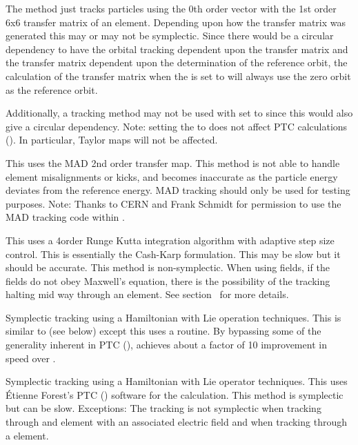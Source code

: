 \begin{description}
\item[\vn{Linear}]
The  method just tracks particles using the 0th order vector with the 1st order 6x6
transfer matrix of an element. Depending upon how the transfer matrix was generated this may or may
not be symplectic. Since there would be a circular dependency to have the orbital tracking dependent
upon the transfer matrix and the transfer matrix dependent upon the determination of the reference
orbit, the calculation of the transfer matrix when the  is set to 
will always use the zero orbit as the reference orbit.

Additionally, a  tracking method may not be used with  set to
 since this would also give a circular dependency. Note: setting the
 to  does not affect PTC calculations (). In
particular, Taylor maps will not be affected.

\item[\vn{MAD}]
This uses the MAD 2nd order transfer map. This method is not able to handle element misalignments or
kicks, and becomes inaccurate as the particle energy deviates from the reference energy. MAD
tracking should only be used for testing purposes. Note: Thanks to CERN and Frank Schmidt for
permission to use the MAD tracking code within \bmad.

\item[\vn{runge_kutta}]
This uses a 4\Th order Runge Kutta integration algorithm with adaptive step size control.  This is
essentially the Cash-Karp formulation. This may be slow but it should be accurate. This method is
non-symplectic.  When using  fields, if the fields do not obey Maxwell's
equation, there is the possibility of the  tracking halting mid way through an
element. See section~ for more details.

\item[\vn{Symp_Lie_Bmad}]
Symplectic tracking using a Hamiltonian with Lie operation techniques.  This is similar to
 (see below) except this uses a \bmad routine. By bypassing some of the generality
inherent in PTC (),  achieves about a factor of 10 improvement
in speed over .

\item[\vn{Symp_Lie_PTC}]
Symplectic tracking using a Hamiltonian with Lie operator techniques.  This uses \'Etienne Forest's
PTC () software for the calculation. This method is symplectic but can be
slow. Exceptions: The tracking is not symplectic when tracking through and element with an
associated electric field and when tracking through a  element.


\end{description}
